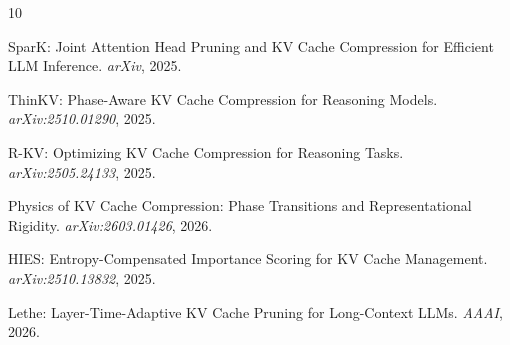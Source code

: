 \documentclass[11pt,a4paper]{article}
\begin{document}
\begin{thebibliography}{10}

SparK: Joint Attention Head Pruning and KV Cache Compression for Efficient LLM Inference. \emph{arXiv}, 2025.

ThinKV: Phase-Aware KV Cache Compression for Reasoning Models. \emph{arXiv:2510.01290}, 2025.

R-KV: Optimizing KV Cache Compression for Reasoning Tasks. \emph{arXiv:2505.24133}, 2025.

Physics of KV Cache Compression: Phase Transitions and Representational Rigidity. \emph{arXiv:2603.01426}, 2026.

HIES: Entropy-Compensated Importance Scoring for KV Cache Management. \emph{arXiv:2510.13832}, 2025.

Lethe: Layer-Time-Adaptive KV Cache Pruning for Long-Context LLMs. \emph{AAAI}, 2026.

\end{thebibliography}
\end{document}

